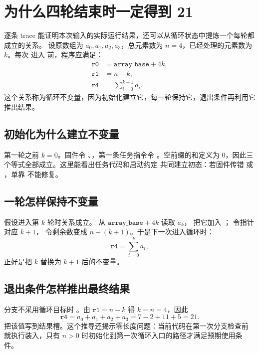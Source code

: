 \section{为什么四轮结束时一定得到 21}

逐条 trace 能证明本次输入的实际运行结果，还可以从循环状态中提炼一个每轮都成立的关系。
设原数组为 \(a_0,a_1,a_2,a_3\)，总元素数为 \(n=4\)，已经处理的元素数为 \(k\)。每次
进入  前，程序应满足：
\[
\begin{aligned}
\texttt{r0} &= \texttt{array\_base}+4k,\\
\texttt{r1} &= n-k,\\
\texttt{r4} &= \sum_{i=0}^{k-1}a_i.
\end{aligned}
\]
这个关系称为循环不变量，因为初始化建立它，每一轮保持它，退出条件再利用它推出结果。

\subsection{初始化为什么建立不变量}

第一轮之前 \(k=0\)。固件令 、，第一条任务指令令
。空前缀的和定义为 0，因此三个等式全部成立。这里能看出任务代码和启动约定
共同建立初态：若固件传错  或 ，单靠  不能修复。

\subsection{一轮怎样保持不变量}

假设进入第 \(k\) 轮时关系成立。 从
\(\texttt{array\_base}+4k\) 读取 \(a_k\)， 把它加入 ；
 令指针对应 \(k+1\)， 令剩余数变成
\(n-(k+1)\)。于是下一次进入循环时：
\[
\texttt{r4}=\sum_{i=0}^{k}a_i,
\]
正好是把 \(k\) 替换为 \(k+1\) 后的不变量。

\subsection{退出条件怎样推出最终结果}

分支不采用循环目标时 。由 \(\texttt{r1}=n-k\) 得 \(k=n=4\)，因此
\[
\texttt{r4}=a_0+a_1+a_2+a_3=7-2+11+5=21.
\]
 把该值写到结果槽。这个推导还揭示零长度问题：当前代码在第一次分支检查前
就执行装入，只有 \(n>0\) 时初始化到第一次循环入口的路径才满足预期使用条件。

